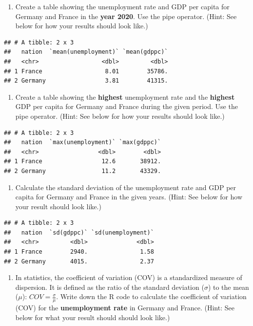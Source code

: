 \documentclass[
  12pt,
  oneside]{book}
\providecommand{\tightlist}{%
  \setlength{\itemsep}{0pt}\setlength{\parskip}{0pt}}
\begin{document}
\begin{enumerate}
\def\labelenumi{(\arabic{enumi})}
\setcounter{enumi}{15}
\tightlist
\item
  Create a table showing the unemployment rate and GDP per capita for Germany
  and France in the \textbf{year 2020}. Use the pipe operator. (Hint: See below for how your results should
  look like.)
\end{enumerate}

\begin{verbatim}
## # A tibble: 2 x 3
##   nation  `mean(unemployment)` `mean(gdppc)`
##   <chr>                  <dbl>         <dbl>
## 1 France                  8.01        35786.
## 2 Germany                 3.81        41315.
\end{verbatim}

\begin{enumerate}
\def\labelenumi{(\arabic{enumi})}
\setcounter{enumi}{16}
\tightlist
\item
  Create a table showing the \textbf{highest} unemployment rate and the \textbf{highest}
  GDP per capita for Germany and France during the given period.
  Use the pipe operator. (Hint: See below for how your results should look like.)
\end{enumerate}

\begin{verbatim}
## # A tibble: 2 x 3
##   nation  `max(unemployment)` `max(gdppc)`
##   <chr>                 <dbl>        <dbl>
## 1 France                 12.6       38912.
## 2 Germany                11.2       43329.
\end{verbatim}

\begin{enumerate}
\def\labelenumi{(\arabic{enumi})}
\setcounter{enumi}{17}
\tightlist
\item
  Calculate the standard deviation of the unemployment rate and GDP per capita for Germany
  and France in the given years. (Hint: See below for how your result should
  look like.)
\end{enumerate}

\begin{verbatim}
## # A tibble: 2 x 3
##   nation  `sd(gdppc)` `sd(unemployment)`
##   <chr>         <dbl>              <dbl>
## 1 France        2940.               1.58
## 2 Germany       4015.               2.37
\end{verbatim}

\begin{enumerate}
\def\labelenumi{(\arabic{enumi})}
\setcounter{enumi}{18}
\tightlist
\item
  In statistics, the coefficient of variation (COV) is a standardized measure of
  dispersion. It is defined as the ratio of the standard deviation (\(\sigma\)) to the mean (\(\mu\)):
  \(COV={\frac {\sigma }{\mu }}\).
  Write down the R code to calculate the coefficient of variation (COV) for the
  \textbf{unemployment rate} in Germany and France. (Hint: See below for what your result should should look like.)
\end{enumerate}
\end{document}
